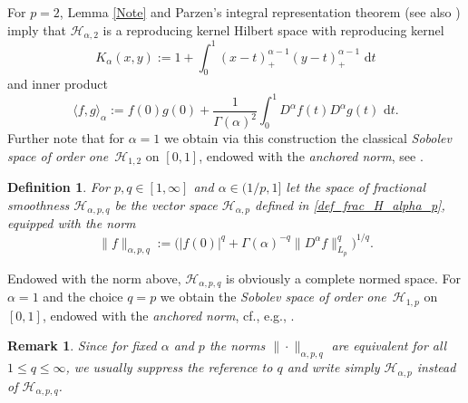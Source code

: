 \documentclass[12pt]{article}
\newtheorem{definition}{Definition}
\newtheorem{remark}{Remark}
\newcommand{\rd}{\,\mathrm{d}}
\newcommand{\RR}{\mathbb{R}}
\newcommand{\HH}{\mathcal{H}}
\newcommand{\N}{\mathbb{N}}
\newcommand{\red}[1]{\textcolor{red}{#1}}
\begin{document}
For $p=2$, Lemma \ref{Note} and Parzen's integral representation theorem
\cite{P63} (see also \cite{K71}) imply that $\HH_{\alpha,2}$ is a
reproducing kernel Hilbert space with reproducing kernel
\begin{equation}\label{eq:rk_1}
K_\alpha(x,y) := 1 +  \int_0^1
(x-t)_+^{\alpha-1} (y-t)_+^{\alpha-1}\,\rd t
\end{equation}
and inner product
\begin{equation*}
\langle f, g\rangle_\alpha := f(0)g(0) + \frac{1}{\Gamma(\alpha)^2} \int_0^1 D^\alpha f(t)
D^\alpha g(t) \,\rd t.
\end{equation*}
Further note that for $\alpha = 1$ we obtain via this construction
the classical \emph{Sobolev space of order one}~$\HH_{1,2}$ on $[0,1]$, 
endowed with the \emph{anchored norm},
see \cite[Appendix~A.2.2]{NW08}.

\begin{definition}\label{Def:Space_Frac_Smooth_Uni}
For $p,q\in [1,\infty]$ and $\alpha\in (1/p,1]$ 
let the \emph{space of fractional smoothness} $\HH_{\alpha, p,q}$ 
be the vector space $\HH_{\alpha, p}$ 
defined in \eqref{def_frac_H_alpha_p}, 
equipped with the norm
\begin{equation*}
\| f \|_{\alpha,p,q} := \big( |f(0)|^{q} + \Gamma(\alpha)^{-q}
\|D^{\alpha}f\|^{q}_{L_p} \big)^{1/q}.
\end{equation*}
\end{definition}

Endowed with the norm above, $\HH_{\alpha,p,q}$ is obviously a complete normed space.
For $\alpha = 1$ and the choice $q=p$ we obtain 
the \emph{Sobolev space of order one}~$\HH_{1,p}$ on $[0,1]$,
endowed with the \emph{anchored norm},
cf., e.g., \cite{HS16}.

\begin{remark}\label{q_egal}
Since for fixed $\alpha$ and $p$ the norms $\|\cdot\|_{\alpha, p,q}$ are equivalent for all 
$1 \le q \le \infty$, we usually suppress the reference to $q$ and write simply $\HH_{\alpha,p}$  instead of $\HH_{\alpha,p,q}$. 
\end{remark}

\end{document}
